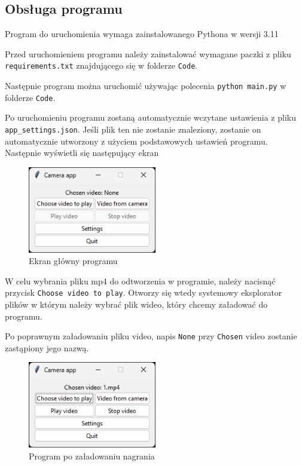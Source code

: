 \subsection{Obsługa programu}
Program do uruchomienia wymaga zainstalowanego Pythona w wersji 3.11

Przed uruchomieniem programu należy zainstalować wymagane paczki z pliku \verb|requirements.txt| znajdującego się w folderze \verb|Code|.

Następnie program można uruchomić używając polecenia \verb|python main.py| w folderze \verb|Code|.

Po uruchomieniu programu zostaną automatycznie wczytane ustawienia z pliku \verb|app_settings.json|. Jeśli plik ten nie zostanie znaleziony, zostanie on automatycznie utworzony z użyciem podstawowych ustawień programu. Następnie wyświetli się następujący ekran

\begin{figure}[H]
	\centering
		\includegraphics[width=0.5\textwidth]{Img/manual/main_screen.png}
	\caption{Ekran główny programu}
	\label{fig:main_screen}
\end{figure}

W celu wybrania pliku mp4 do odtworzenia w programie, należy nacisnąć przycisk \verb|Choose video to play|. Otworzy się wtedy systemowy eksplorator plików w którym należy wybrać plik wideo, który chcemy załadować do programu.

Po poprawnym załadowaniu pliku video, napis \verb|None| przy \verb|Chosen| video zostanie zastąpiony jego nazwą.

\begin{figure}[H]
	\centering
	\includegraphics[width=0.5\textwidth]{Img/manual/video_loaded.png}
	\caption{Program po załadowaniu nagrania}
	\label{fig:video_loaded}
\end{figure}

